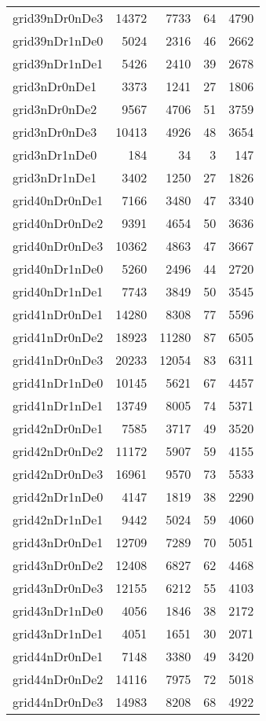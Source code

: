 \documentclass[../../../thesis.tex]{subfiles}
\begin{document}
\begin{longtable}{lrrrr}
grid39nDr0nDe3 & 14372 & 7733 & 64 & 4790 \\
grid39nDr1nDe0 & 5024 & 2316 & 46 & 2662 \\
grid39nDr1nDe1 & 5426 & 2410 & 39 & 2678 \\
grid3nDr0nDe1 & 3373 & 1241 & 27 & 1806 \\
grid3nDr0nDe2 & 9567 & 4706 & 51 & 3759 \\
grid3nDr0nDe3 & 10413 & 4926 & 48 & 3654 \\
grid3nDr1nDe0 & 184 & 34 & 3 & 147 \\
grid3nDr1nDe1 & 3402 & 1250 & 27 & 1826 \\
grid40nDr0nDe1 & 7166 & 3480 & 47 & 3340 \\
grid40nDr0nDe2 & 9391 & 4654 & 50 & 3636 \\
grid40nDr0nDe3 & 10362 & 4863 & 47 & 3667 \\
grid40nDr1nDe0 & 5260 & 2496 & 44 & 2720 \\
grid40nDr1nDe1 & 7743 & 3849 & 50 & 3545 \\
grid41nDr0nDe1 & 14280 & 8308 & 77 & 5596 \\
grid41nDr0nDe2 & 18923 & 11280 & 87 & 6505 \\
grid41nDr0nDe3 & 20233 & 12054 & 83 & 6311 \\
grid41nDr1nDe0 & 10145 & 5621 & 67 & 4457 \\
grid41nDr1nDe1 & 13749 & 8005 & 74 & 5371 \\
grid42nDr0nDe1 & 7585 & 3717 & 49 & 3520 \\
grid42nDr0nDe2 & 11172 & 5907 & 59 & 4155 \\
grid42nDr0nDe3 & 16961 & 9570 & 73 & 5533 \\
grid42nDr1nDe0 & 4147 & 1819 & 38 & 2290 \\
grid42nDr1nDe1 & 9442 & 5024 & 59 & 4060 \\
grid43nDr0nDe1 & 12709 & 7289 & 70 & 5051 \\
grid43nDr0nDe2 & 12408 & 6827 & 62 & 4468 \\
grid43nDr0nDe3 & 12155 & 6212 & 55 & 4103 \\
grid43nDr1nDe0 & 4056 & 1846 & 38 & 2172 \\
grid43nDr1nDe1 & 4051 & 1651 & 30 & 2071 \\
grid44nDr0nDe1 & 7148 & 3380 & 49 & 3420 \\
grid44nDr0nDe2 & 14116 & 7975 & 72 & 5018 \\
grid44nDr0nDe3 & 14983 & 8208 & 68 & 4922 \\

\end{longtable}
\end{document}
